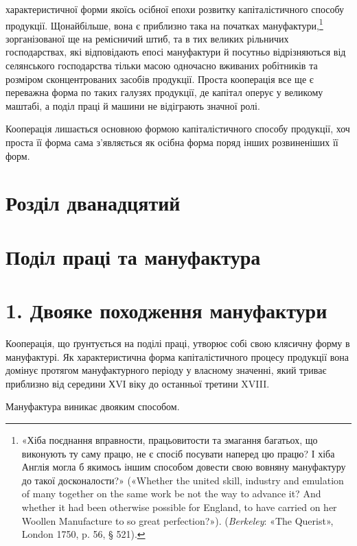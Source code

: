 \parcont{}  %
характеристичної форми якоїсь осібної епохи розвитку капіталістичного
способу продукції. Щонайбільше, вона є приблизно
така на початках мануфактури,\footnote{
«Хіба поєднання вправности, працьовитости та змагання багатьох,
що виконують ту саму працю, не є спосіб посувати наперед цю працю?
І хіба Англія могла б якимось іншим способом довести свою вовняну мануфактуру
до такої досконалости?» («Whether the united skill, industry
and emulation of many together on the same work be not the way to advance
it? And whether it had been otherwise possible for England, to have
carried on her Woollen Manufacture to so great perfection?»). (\emph{Berkeley}: «The
Querist», London 1750, p. 56, § 521).
} зорганізованої ще на ремісничий
штиб, та в тих великих рільничих господарствах, які відповідають
епосі мануфактури й посутньо відрізняються від селянського
господарства тільки масою одночасно вживаних робітників
та розміром сконцентрованих засобів продукції. Проста кооперація
все ще є переважна форма по таких галузях продукції, де
капітал оперує у великому маштабі, а поділ праці й машини не
відіграють значної ролі.

Кооперація лишається основною формою капіталістичного способу
продукції, хоч проста її форма сама з’являється як осібна
форма поряд інших розвиненіших її форм.

\section*{Розділ дванадцятий}

\section*{Поділ праці та мануфактура}

\section*{1. Двояке походження мануфактури}

Кооперація, що ґрунтується на поділі праці, утворює собі
свою клясичну форму в мануфактурі. Як характеристична форма
капіталістичного процесу продукції вона домінує протягом мануфактурного
періоду у власному значенні, який триває приблизно
від середини ХVІ віку до останньої третини XVIII.

Мануфактура виникає двояким способом.

